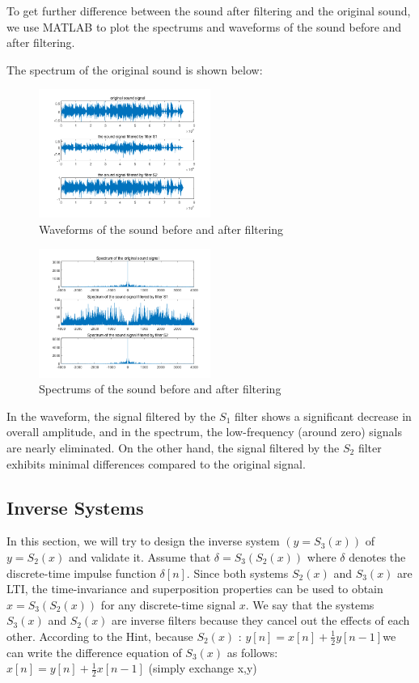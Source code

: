 \documentclass[journal]{IEEEtran}
\begin{document}
To get further difference between the sound after filtering and the original sound, we use MATLAB to plot the spectrums and waveforms of the sound before and after filtering. 

The spectrum of the original sound is shown below:

\begin{figure}[H]
   \centering
   \includegraphics[width=0.5\textwidth]{2.5.1.png} %
   \caption{Waveforms of the sound before and after filtering}
   \label{fig:2.5.1}
\end{figure}

\begin{figure}[H]
   \centering
   \includegraphics[width=0.5\textwidth]{2.5.2.png} %
   \caption{Spectrums of the sound before and after filtering}
   \label{fig:2.5.2}
\end{figure}

In the waveform, the signal filtered by the $S_{1}$ filter shows a significant decrease in overall amplitude, and in the spectrum, the low-frequency (around zero) signals are nearly eliminated. On the other hand, 
the signal filtered by the $S_{2}$ filter exhibits minimal differences compared to the original signal.


\subsection{Inverse Systems}
In this section, we will try to design the inverse system $(y=S_{3}(x))$ of $y=S_{2}(x)$ and validate it.
Assume that $\delta = S_{3}(S_{2}(x))$ where $\delta$ denotes the discrete-time impulse function $\delta [n]$. Since both systems $S_{2}(x)$ and $S_{3}(x)$ are LTI, the time-invariance and superposition properties can be used to obtain $x = S_{3}(S_{2}(x))$ for any discrete-time signal $x$. We say that the systems $S_{3}(x)$ and $S_{2}(x)$ are inverse filters because 
they cancel out the effects of each other. 
According to the Hint, because $S_{2}(x)$ : $y[n]=x[n]+\frac{1}{2}y[n-1]$we can write the difference equation 
of $S_{3}(x)$ as follows:$~~~$$x[n]=y[n]+\frac{1}{2}x[n-1]$
(simply exchange x,y) 
\end{document}
